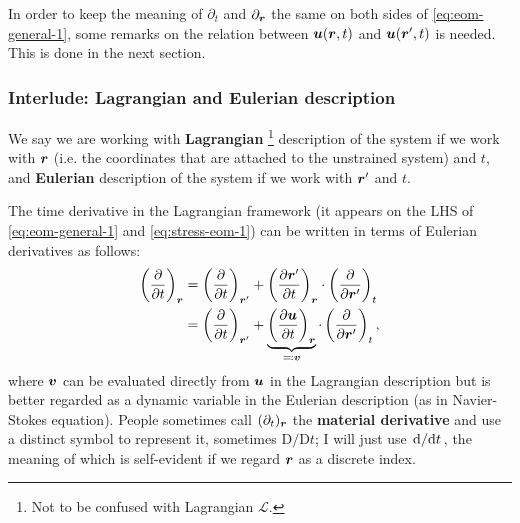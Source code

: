 \documentclass[hyperref, a4paper]{article}
\newcommand*{\concept}[1]{{\textbf{#1}}}
\begin{document}
In order to keep the meaning of $\partial_t$ and $\partial_{\vb*{r}}$ the same 
on both sides of \eqref{eq:eom-general-1},
some remarks on the relation 
between $\vb*{u}(\vb*{r}, t)$ and $\vb*{u}(\vb*{r}', t)$ is needed.
This is done in the next section.

\subsubsection{Interlude: Lagrangian and Eulerian description}\label{sec:lagrangian-and-eulerian}

We say we are working with \concept{Lagrangian}%
\footnote{
    Not to be confused with Lagrangian $\mathcal{L}$.
}
description of the system if we work with $\vb*{r}$
(i.e. the coordinates that are attached to the 
unstrained system) and $t$,
and \concept{Eulerian} description of the system 
if we work with $\vb*{r}'$ and $t$.

The time derivative in the Lagrangian framework 
(it appears on the LHS of \eqref{eq:eom-general-1} and \eqref{eq:stress-eom-1})
can be written in terms of Eulerian derivatives as follows:
\begin{equation}
    \begin{aligned}
        \left(\pdv{t}\right)_{\vb*{r}} &= \left(\pdv{t}\right)_{\vb*{r}'} +
        \left(\pdv{\vb*{r}'}{t}\right)_{\vb*{r}} \cdot \left(\pdv{\vb*{r}'}\right)_t \\
        &= \left(\pdv{t}\right)_{\vb*{r}'} +
        \underbrace{\left(\pdv{\vb*{u}}{t}\right)_{\vb*{r}}}_{\eqqcolon \vb*{v}} \cdot \left(\pdv{\vb*{r}'}\right)_t,
    \end{aligned}
\end{equation}
where $\vb*{v}$ can be evaluated directly from $\vb*{u}$ in the Lagrangian description
but is better regarded as a dynamic variable in the Eulerian description 
(as in Navier-Stokes equation).
People sometimes call $(\partial_t)_{\vb*{r}}$ 
the \concept{material derivative} 
and use a distinct symbol to represent it,
sometimes $\mathrm{D}/\mathrm{D}t$;
I will just use $\dv*{t}$,
the meaning of which is self-evident if we regard $\vb*{r}$ as a discrete index.
\end{document}
